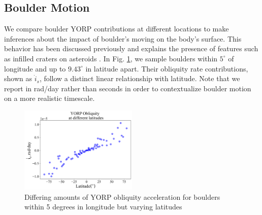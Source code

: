 \subsection{Boulder Motion}
We compare boulder YORP contributions at different locations to make inferences about the impact of boulder's moving on the body's surface. This behavior has been discussed previously and explains the presence of features such as infilled craters on asteroids \citep{Brack2019}. In Fig. \ref{fig:ob_motion_nodelta}, we sample boulders within $5^{\circ}$ of longitude and up to $9.43^{\circ}$ in latitude apart. Their obliquity rate contributions, shown as $\dot{i}_s$, follow a distinct linear relationship with latitude. Note that we report in rad/day rather than seconds in order to contextualize boulder motion on a more realistic timescale.
\begin{figure}[H]
    \centering
    \includegraphics[width=0.5\textwidth]{fig/obliq_amt_boulder_motion_bennu.png}
    \caption{Differing amounts of YORP obliquity acceleration for boulders within 5 degrees in longitude but varying latitudes}
    \label{fig:ob_motion_nodelta}
\end{figure}

